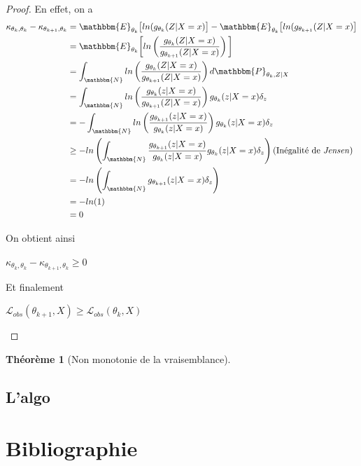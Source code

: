 \documentclass[frenchb]{report}
\newcommand{\N}{\mathbbm{N}}
\newcommand{\1}{\mathbbm{1}}
\newcommand{\E}{\mathbbm{E}}
\newcommand{\prob}{\mathbbm{P}}
\newcommand{\lv}{\mathcal{L}}
\newtheorem{thm}{Théorème}
\theoremstyle{definition}\newtheorem{defn}{Définition}
\theoremstyle{definition}\newtheorem{exm}{Exemple}
\theoremstyle{definition}\newtheorem{nota}{Notation}
\theoremstyle{definition}\newtheorem{rem}{Remarque}
\begin{document}
\begin{proof}
En effet, on a
\begin{align*}
\kappa_{\theta_{k}, \theta_k}-\kappa_{\theta_{k+1}, \theta_k} &= \E_{\theta_k}\big[ln(g_{\theta_k}(Z|X=x)\big] - \E_{\theta_k}\big[ln(g_{\theta_{k+1}}(Z|X=x)\big]\\
&= \E_{\theta_k}\bigg[ ln\left(\frac{g_{\theta_k}(Z|X=x)}{g_{\theta_{k+1}}(Z|X=x)}\right) \bigg]\\
&= \displaystyle\int_\N ln\left( \frac{g_{\theta_k}(Z|X=x)}{g_{\theta_{k+1}}(Z|X=x)} \right) d\prob_{\theta_k, Z | X} \\
&= \displaystyle\int_\N ln\left( \frac{g_{\theta_k}(z|X=x)}{g_{\theta_{k+1}}(Z|X=x)}\right) g_{\theta_k}(z|X=x)\delta_z  \\
&= - \displaystyle\int_\N ln\left( \frac{g_{\theta_{k+1}}(z|X=x)}{g_{\theta_k}(z|X=x)}\right) g_{\theta_k}(z|X=x)\delta_z  \\
&\geq - ln\left( \displaystyle\int_\N \frac{g_{\theta_{k+1}}(z|X=x)}{g_{\theta_k}(z|X=x)} g_{\theta_k}(z|X=x)\delta_z \right) \text{(Inégalité de \textit{Jensen})}\\
&= - ln\left( \displaystyle\int_\N g_{\theta_{k+1}}(z|X=x)\delta_z \right)\\
&= -ln(1)\\
&= 0
\end{align*}

On obtient ainsi

\begin{center} $\kappa_{\theta_{k}, \theta_k}-\kappa_{\theta_{k+1}, \theta_k} \geq 0$ \end{center}


Et finalement
\begin{center} $\lv_{obs}(\theta_{k+1}, X) \geq \lv_{obs}(\theta_k, X)$ \end{center}

\end{proof}


\begin{thm}[Non monotonie de la vraisemblance]

\end{thm}

\section{L'algo}



\chapter*{Bibliographie}
 
\end{document}
